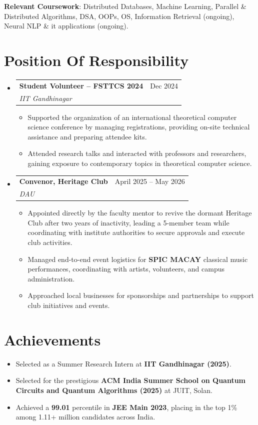 \documentclass[letterpaper,11pt]{article}
\makeatletter
\newcommand{\resumeItem}[1]{\item\small{{#1 \vspace{-2pt}}}}
\newcommand{\resumeSubheading}[4]{
  \vspace{1pt}\item
    \begin{tabular*}{0.97\textwidth}[t]{l@{\extracolsep{\fill}}r}
      \textbf{#1} & #2 \\
      \textit{\small#3} & \textit{\small #4} \\
    \end{tabular*}\vspace{-10pt}
}
\newcommand{\resumeSubHeadingListStart}{\begin{itemize}[leftmargin=0.15in, label={}]}
\newcommand{\resumeSubHeadingListEnd}{\end{itemize}}
\newcommand{\resumeItemListStart}{\vspace{4pt}\begin{itemize}}
\newcommand{\resumeItemListEnd}{\end{itemize}\vspace{-7pt}}
\newcommand{\listOfSkills}[2]{\vspace{0.1em}\hspace{1em}\small\textbf{#1}: {#2} \\}
\makeatother
\begin{document}
\listOfSkills{Relevant Coursework}{Distributed Databases, Machine Learning, Parallel \& Distributed Algorithms, DSA, OOPs, OS, Information Retrieval (ongoing), Neural NLP \& it applications (ongoing).}


\section{Position Of Responsibility}
\resumeSubHeadingListStart
  \resumeSubheading
    {Student Volunteer -- FSTTCS 2024}{Dec 2024}
    {IIT Gandhinagar}{}
    \resumeItemListStart
        \resumeItem{Supported the organization of an international theoretical computer science conference by managing registrations, providing on-site technical assistance and preparing attendee kits.}
        \resumeItem{Attended research talks and interacted with professors and researchers, gaining exposure to contemporary topics in theoretical computer science.}
    \resumeItemListEnd

\resumeSubheading
    {Convenor, Heritage Club}{April 2025 -- May 2026}
    {DAU}{}
    \resumeItemListStart
        \resumeItem{Appointed directly by the faculty mentor to revive the dormant Heritage Club after two years of inactivity, leading a 5-member team while coordinating with institute authorities to secure approvals and execute club activities.}
        \resumeItem{Managed end-to-end event logistics for \textbf{SPIC MACAY} classical music performances, coordinating with artists, volunteers, and campus administration.}
        \resumeItem{Approached local businesses for sponsorships and partnerships to support club initiatives and events.}
    \resumeItemListEnd
    
\resumeSubHeadingListEnd

\section{Achievements}
\resumeItemListStart
  \resumeItem{Selected as a Summer Research Intern at \textbf{IIT Gandhinagar (2025)}.}
  \resumeItem{Selected for the prestigious \textbf{ACM India Summer School on Quantum Circuits and Quantum Algorithms (2025)} at JUIT, Solan.}
  \resumeItem{Achieved a \textbf{99.01} percentile in \textbf{JEE Main 2023}, placing in the top 1\% among 1.11+ million candidates across India.}

\resumeItemListEnd

\end{document}
